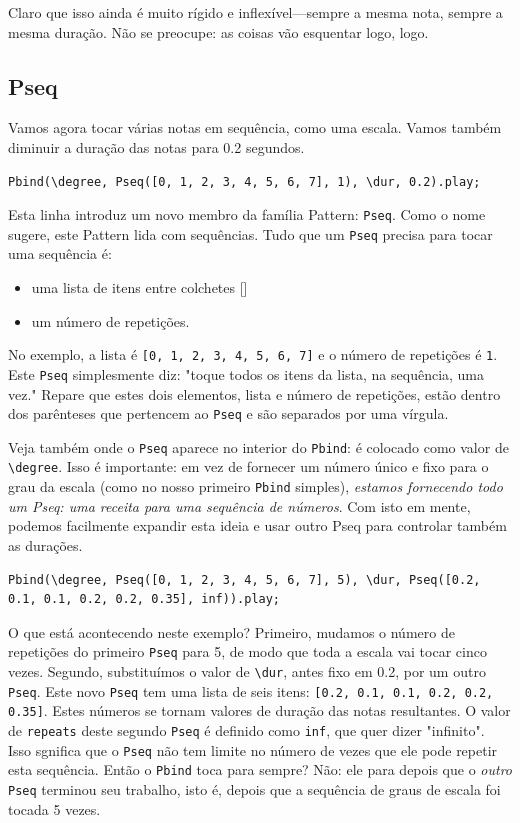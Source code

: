 Claro que isso ainda é muito rígido e inflexível---sempre a mesma nota, sempre a mesma duração. Não se preocupe: as coisas vão esquentar logo, logo.
\subsection{Pseq}

Vamos agora tocar várias notas em sequência, como uma escala. Vamos também diminuir a duração das notas para 0.2 segundos.
 
\begin{lstlisting}[style=SuperCollider-IDE, basicstyle=\scttfamily\footnotesize]
Pbind(\degree, Pseq([0, 1, 2, 3, 4, 5, 6, 7], 1), \dur, 0.2).play;
\end{lstlisting}

Esta linha introduz um novo membro da família Pattern: \texttt{Pseq}. Como o nome sugere, este Pattern lida com sequências. Tudo que um \texttt{Pseq} precisa para tocar uma sequência é:
\begin{itemize}
\item uma lista de itens entre colchetes []
\item um número de repetições.
\end{itemize} 

No exemplo, a lista é \texttt{[0, 1, 2, 3, 4, 5, 6, 7]} e o número de repetições é \texttt{1}. Este \texttt{Pseq} simplesmente diz: "toque todos os itens da lista, na sequência, uma vez." Repare que estes dois elementos, lista e número de repetições, estão dentro dos parênteses que pertencem ao \texttt{Pseq} e são separados por uma vírgula.

Veja também onde o \texttt{Pseq} aparece no interior do \texttt{Pbind}: é colocado como valor de \texttt{\textbackslash degree}. Isso é importante: em vez de fornecer um número único e fixo para o grau da escala (como no nosso primeiro \texttt{Pbind} simples), \emph{estamos fornecendo todo um Pseq: uma receita para uma sequência de números}. Com isto em mente, podemos facilmente expandir esta ideia e usar outro Pseq para controlar também as durações.
 
\begin{lstlisting}[style=SuperCollider-IDE, basicstyle=\scttfamily\footnotesize]
Pbind(\degree, Pseq([0, 1, 2, 3, 4, 5, 6, 7], 5), \dur, Pseq([0.2, 0.1, 0.1, 0.2, 0.2, 0.35], inf)).play;
\end{lstlisting}
 
O que está acontecendo neste exemplo? Primeiro, mudamos o número de repetições do primeiro \texttt{Pseq} para 5, de modo que toda a escala vai tocar cinco vezes. Segundo, substituímos o valor de \texttt{\textbackslash dur}, antes fixo em 0.2, por um outro \texttt{Pseq}. Este novo \texttt{Pseq} tem uma lista de seis itens: \texttt{[0.2, 0.1, 0.1, 0.2, 0.2, 0.35]}. Estes números se tornam valores de duração das notas resultantes. O valor de \texttt{repeats} deste segundo \texttt{Pseq} é definido como \texttt{inf}, que quer dizer "infinito". Isso sgnifica que o \texttt{Pseq} não tem limite no número de vezes que ele pode repetir esta sequência. Então o \texttt{Pbind} toca para sempre? Não: ele para depois que o \emph{outro} \texttt{Pseq} terminou seu trabalho, isto é, depois que a sequência de graus de escala foi tocada 5 vezes.

